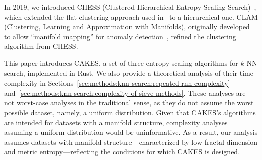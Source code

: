 In 2019, we introduced CHESS (Clustered Hierarchical Entropy-Scaling Search)~\cite{ishaq2019clustered}, which extended the flat clustering approach used in~\cite{yu2015entropy} to a hierarchical one.
CLAM (Clustering, Learning and Approximation with Manifolds), originally developed to allow ``manifold mapping'' for anomaly detection~\cite{ishaq2021clustered}, refined the clustering algorithm from CHESS.


This paper introduces CAKES, a set of three entropy-scaling algorithms for $k$-NN search, implemented in Rust. We also provide a theoretical analysis of their time complexity in Sections~\ref{sec:methods:knn-search:repeated-rnn-complexity} and~\ref{sec:methods:knn-search:complexity-of-sieve-methods}.
These analyses are not worst-case analyses in the traditional sense, as they do not assume the worst possible dataset, namely, a uniform distribution.
Given that CAKES's algorithms are intended for datasets with a manifold structure, complexity analyses assuming a uniform distribution would be uninformative.
As a result, our analysis assumes datasets with manifold structure—characterized by low fractal dimension and metric entropy—reflecting the conditions for which CAKES is designed.
